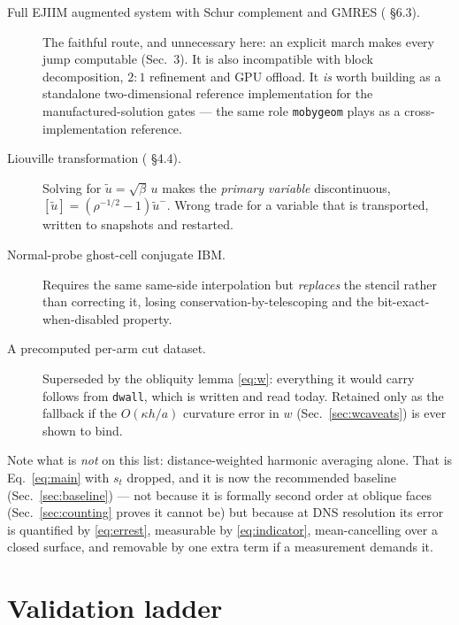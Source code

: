 \documentclass[11pt,a4paper]{article}
\newcommand{\jump}[1]{\left[#1\right]}
\newcommand{\code}[1]{\texttt{#1}}
\begin{document}
\begin{description}
\item[Full EJIIM augmented system with Schur complement and GMRES
      (\cite{ejiim2000} \S6.3).] The faithful route, and unnecessary here: an
      explicit march makes every jump computable (Sec.~3). It is also
      incompatible with block decomposition, $2\!:\!1$ refinement and GPU
      offload. It \emph{is} worth building as a standalone two-dimensional
      reference implementation for the manufactured-solution gates --- the same
      role \code{mobygeom} plays as a cross-implementation reference.
\item[Liouville transformation (\cite{ejiim2000} \S4.4).] Solving for
      $\tilde u=\sqrt{\beta}\,u$ makes the \emph{primary variable}
      discontinuous, $\jump{\tilde u}=(\rho^{-1/2}-1)\tilde u^-$. Wrong trade for
      a variable that is transported, written to snapshots and restarted.
\item[Normal-probe ghost-cell conjugate IBM.] Requires the same same-side
      interpolation but \emph{replaces} the stencil rather than correcting it,
      losing conservation-by-telescoping and the bit-exact-when-disabled
      property.
\item[A precomputed per-arm cut dataset.] Superseded by the obliquity lemma
      \eqref{eq:w}: everything it would carry follows from \code{dwall}, which
      is written and read today. Retained only as the fallback if the
      $O(\kappa h/a)$ curvature error in $w$ (Sec.~\ref{sec:wcaveats}) is ever
      shown to bind.
\end{description}

\noindent
Note what is \emph{not} on this list: distance-weighted harmonic averaging
alone. That is Eq.~\eqref{eq:main} with $s_t$ dropped, and it is now the
recommended baseline (Sec.~\ref{sec:baseline}) --- not because it is formally
second order at oblique faces (Sec.~\ref{sec:counting} proves it cannot be) but
because at DNS resolution its error is quantified by \eqref{eq:errest},
measurable by \eqref{eq:indicator}, mean-cancelling over a closed surface, and
removable by one extra term if a measurement demands it.

\section{Validation ladder}
\end{document}

